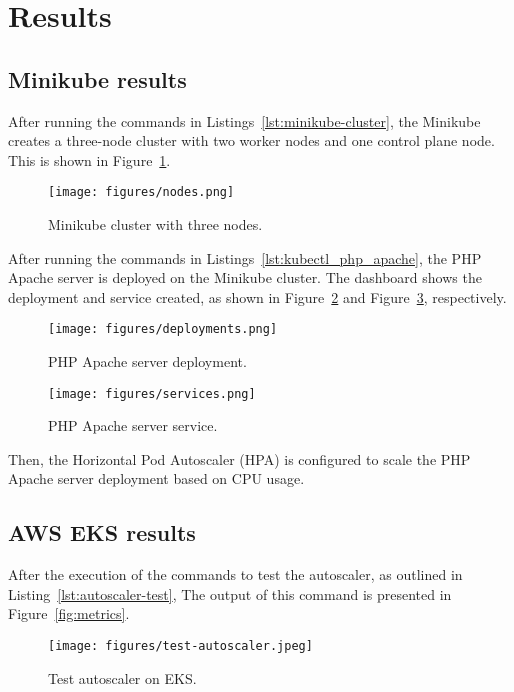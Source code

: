 \section{Results}
\subsection{Minikube results}
After running the commands in Listings~\ref{lst:minikube-cluster}, the Minikube creates a three-node cluster with two worker nodes and one control plane node.
This is shown in Figure~\ref{fig:minikube-cluster}.

\begin{figure}[htbp]
  \centering
  \texttt{[image: figures/nodes.png]}
  \caption{Minikube cluster with three nodes.}
  \label{fig:minikube-cluster}
\end{figure}

After running the commands in Listings~\ref{lst:kubectl_php_apache}, the PHP Apache server is deployed on the Minikube cluster.
The dashboard shows the deployment and service created, as shown in Figure~\ref{fig:deployments} and Figure~\ref{fig:services}, respectively.

\begin{figure}[htbp]
  \centering
  \texttt{[image: figures/deployments.png]}
  \caption{PHP Apache server deployment.}
  \label{fig:deployments}
\end{figure}

\begin{figure}[htbp]
  \centering
  \texttt{[image: figures/services.png]}
  \caption{PHP Apache server service.}
  \label{fig:services}
\end{figure}

Then, the Horizontal Pod Autoscaler (HPA) is configured to scale the PHP Apache server deployment based on CPU usage.


\subsection{AWS EKS results}

After the execution of the commands to test the autoscaler, as outlined in Listing~\ref{lst:autoscaler-test}, The output of this command is presented in Figure~\ref{fig:metrics}.

\begin{figure}[htbp]
  \centering
  \texttt{[image: figures/test-autoscaler.jpeg]}
  \caption{Test autoscaler on EKS.}
  \label{fig:test-autoscaler}
\end{figure}

